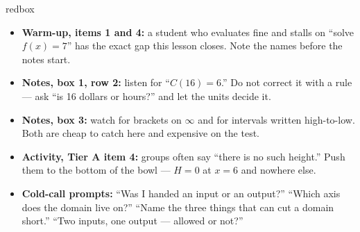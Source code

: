 \documentclass[10pt]{article}
\begin{document}
\begin{skillbox}{redbox}
\begin{itemize}[leftmargin=1.2em, itemsep=2pt, topsep=2pt]
  \item \textbf{Warm-up, items 1 and 4:} a student who evaluates fine and stalls on ``solve
        $f(x)=7$'' has the exact gap this lesson closes. Note the names before the notes start.
  \item \textbf{Notes, box 1, row 2:} listen for ``$C(16)=6$.'' Do not correct it with a rule ---
        ask ``is 16 dollars or hours?'' and let the units decide it.
  \item \textbf{Notes, box 3:} watch for brackets on $\infty$ and for intervals written high-to-low.
        Both are cheap to catch here and expensive on the test.
  \item \textbf{Activity, Tier A item 4:} groups often say ``there is no such height.'' Push them
        to the bottom of the bowl --- $H=0$ at $x=6$ and nowhere else.
  \item \textbf{Cold-call prompts:} ``Was I handed an input or an output?'' ``Which axis does the
        domain live on?'' ``Name the three things that can cut a domain short.'' ``Two inputs,
        one output --- allowed or not?''
\end{itemize}
\end{skillbox}
\end{document}
